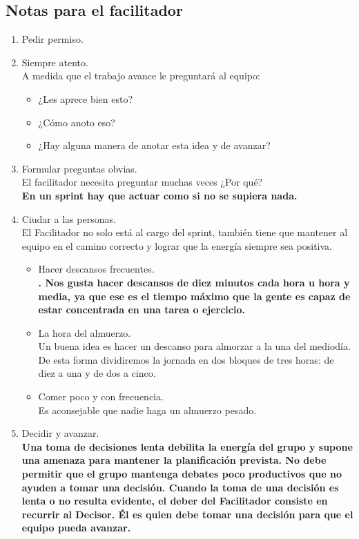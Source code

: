 \documentclass[10pt]{article}
\begin{document}
\begin{multicols}{2}
\subsection*{Notas para el facilitador}
\begin{enumerate}[\bfseries 1.]
\item Pedir permiso.
\item Siempre atento.\\
A medida que el trabajo avance le preguntará al equipo:
\begin{itemize}
\item ¿Les aprece bien esto?
\item ¿Cómo anoto eso?
\item ¿Hay alguna manera de anotar esta idea y de avanzar?
\end{itemize}
\item Formular preguntas obvias.\\
El facilitador necesita preguntar muchas veces ¿Por qué?\\
\textbf{En un sprint hay que actuar como si no se supiera nada.}
\item Ciudar a las personas.\\
El Facilitador no solo está al cargo del sprint, también tiene que mantener al equipo en el camino correcto y lograr que la energía siempre sea positiva.
\begin{itemize}
\item Hacer descansos frecuentes.\\
\textbf{. Nos gusta hacer descansos de diez minutos cada hora u hora y media, ya que ese es el tiempo máximo que la gente es capaz de estar concentrada en una tarea o ejercicio.}
\item La hora del almuerzo.\\
Un buena idea es hacer un descanso para almorzar a la una del
mediodía. De esta forma dividiremos la jornada en dos bloques de tres horas: de diez a una y de dos a cinco.
\item Comer poco y con frecuencia.\\
Es aconsejable que nadie haga un almuerzo pesado.
\end{itemize}
\item Decidir y avanzar.\\
\textbf{Una toma de decisiones lenta debilita la energía del grupo y supone una amenaza para mantener la planificación prevista. No debe permitir que el grupo mantenga debates poco productivos que no ayuden a tomar una decisión. Cuando la toma de una decisión es lenta o no resulta evidente, el deber del Facilitador consiste en recurrir al Decisor. Él es quien debe tomar una decisión para que el equipo pueda avanzar.}
\end{enumerate}
\end{multicols}
\end{document}
